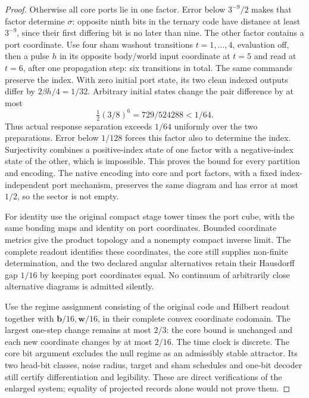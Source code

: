 \documentclass[11pt,a4paper]{article}
\theoremstyle{definition}
\begin{document}
\begin{proof}
Otherwise all core ports lie in one factor. Error below $3^{-9}/2$ makes
that factor determine $\sigma$: opposite ninth bits in the ternary code
have distance at least $3^{-9}$, since their first differing bit is no later
than nine. The other factor contains a port coordinate. Use four sham
washout transitions $t=1,\ldots,4$, evaluation off, then a pulse $h$ in its
opposite body/world input coordinate at $t=5$ and read at $t=6$, after one
propagation step: six transitions in total. The same commands preserve
the index. With zero initial port state, its two clean indexed outputs differ
by $2\beta h/4=1/32$. Arbitrary initial states change the pair difference by
at most
\[
 \tfrac12(3/8)^6=729/524288<1/64.
\]
Thus actual response separation exceeds $1/64$ uniformly over the two
preparations. Error below $1/128$ forces this factor also to determine the
index. Surjectivity combines a positive-index state of one factor with a
negative-index state of the other, which is impossible. This proves the
bound for every partition and encoding. The native encoding into core and
port factors, with a fixed index-independent port mechanism, preserves the
same diagram and has error at most $1/2$, so the sector is not empty.

For identity use the original compact stage tower times the port cube, with
the same bonding maps and identity on port coordinates. Bounded coordinate
metrics give the product topology and a nonempty compact inverse limit.
The complete readout identifies these coordinates, the core still supplies
non-finite determination, and the two declared angular alternatives retain
their Hausdorff gap $1/16$ by keeping port coordinates equal. No continuum
of arbitrarily close alternative diagrams is admitted silently.

Use the regime assignment consisting of the original code and Hilbert
readout together with $\mathbf b/16,\mathbf w/16$, in their complete convex
coordinate codomain. The largest one-step change remains at most $2/3$:
the core bound is unchanged and each new coordinate changes by at most
$2/16$. The time clock is discrete. The core bit argument excludes the
null regime as an admissibly stable attractor. Its two head-bit classes,
noise radius, target and sham schedules and one-bit decoder still certify
differentiation and legibility. These are direct verifications of the
enlarged system; equality of projected records alone would not prove them.
\end{proof}
\end{document}
